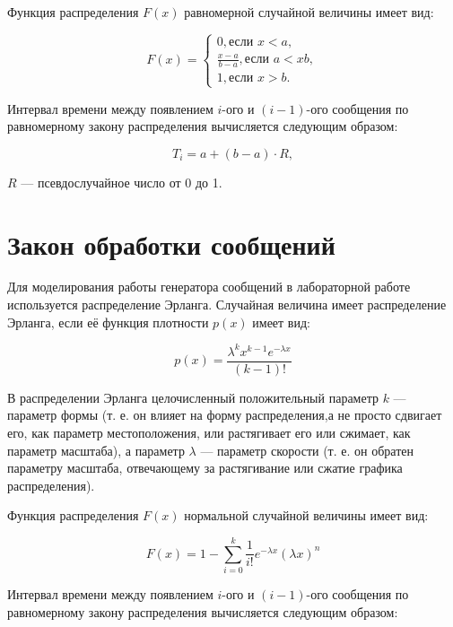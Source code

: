 Функция распределения $F(x)$ равномерной случайной величины имеет вид:

\begin{equation}
	\label{for:equal-2}
    F(x) = 
    \begin{cases}
    	0, \text{если } x  < a, \\
        \frac{x - a}{b - a}, \text{если } a < x  b,\\
        1, \text{если } x > b. 
    \end{cases}
\end{equation}

Интервал времени между появлением $i$-ого и $(i - 1)$-ого сообщения по равномерному закону распределения вычисляется следующим образом:

\begin{equation}
	T_{i} = a + (b - a) \cdot R,
\end{equation}

 $R$ --- псевдослучайное число от 0 до 1.

\section*{Закон обработки сообщений}

Для моделирования работы генератора сообщений в лабораторной работе используется распределение Эрланга. 
Случайная величина имеет распределение Эрланга, если её функция плотности $p(x)$ имеет вид:

\begin{equation}
p(x) = \frac{\lambda^k x^{k-1} e^{-\lambda x} } {(k-1)!}
\end{equation}

В распределении Эрланга целочисленный положительный параметр $k$ 	--- параметр формы (т. е. он влияет на форму распределения,а не просто сдвигает его, как параметр местоположения, или растягивает его или сжимает, как параметр масштаба), а параметр $\lambda$ --- параметр скорости (т. е. он обратен параметру масштаба, отвечающему за растягивание или сжатие графика распределения). 

Функция распределения $F(x)$ нормальной случайной величины имеет вид:

\begin{equation*}
F(x) = 1 - \sum_{i=0}^k  \frac{1}{i!} e^{-\lambda x} (\lambda x)^n
\end{equation*}

Интервал времени между появлением $i$-ого и $(i - 1)$-ого сообщения по равномерному закону распределения вычисляется следующим образом:

